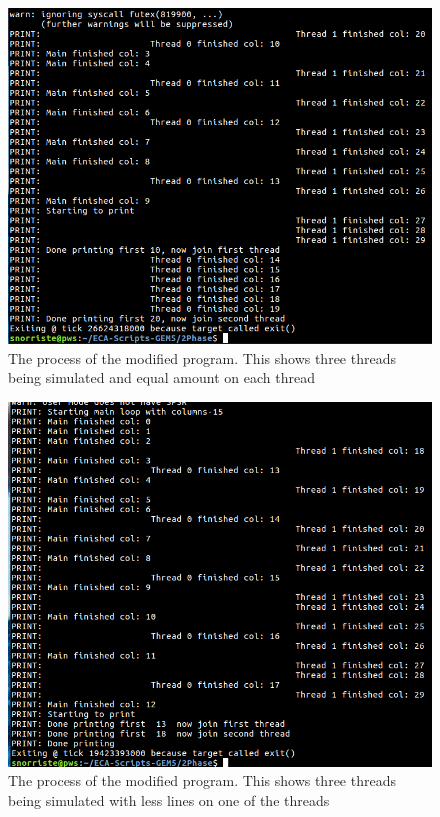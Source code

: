 \documentclass[journal]{IEEEtran}
\begin{document}
\begin{figure}[!h]
	\centering
	\includegraphics[width=.99\linewidth]{printing-bad}
	\caption{The process of the modified program. This shows three threads being simulated and equal amount on each thread}
	\label{fig:printingbad}
\end{figure}

\begin{figure}[!h]
	\centering
	\includegraphics[width=.99\linewidth]{printing-good}
	\caption{The process of the modified program. This shows three threads being simulated with less lines on one of the threads}
	\label{fig:printinggood}
\end{figure}
\end{document}
